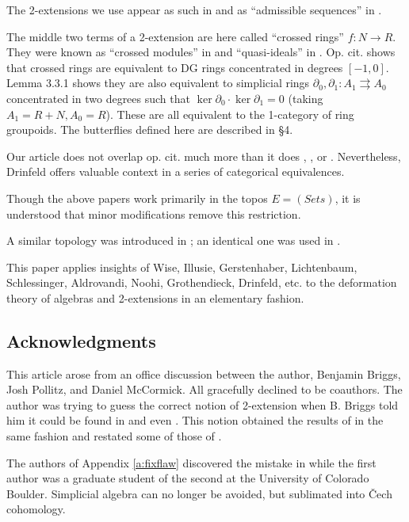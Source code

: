 \documentclass[11pt,reqno]{amsart}
\theoremstyle{definition}
\begin{document}
The 2-extensions we use appear as such in \cite{lichtenbaumschlessinger} and as ``admissible sequences'' in \cite{gerstenhaber2}. 

The middle two terms of a 2-extension are here called ``crossed rings'' $f : N \to R$. They were known as ``crossed modules'' in \cite{aldrovandianncats} and ``quasi-ideals'' in \cite{ringgroupoiddrinfeld}. Op. cit. shows that crossed rings are equivalent to DG rings concentrated in degrees $[-1, 0]$. Lemma 3.3.1 shows they are also equivalent to simplicial rings $\partial_0, \partial_1 : A_1 \rightrightarrows A_0$ concentrated in two degrees such that $\ker \partial_0 \cdot \ker \partial_1 = 0$ (taking $A_1 = R + N, A_0 = R$). These are all equivalent to the 1-category of ring groupoids. The butterflies defined here are described in \S 4. 

Our article does not overlap op. cit. much more than it does \cite{aldrovandianncats}, \cite{lichtenbaumschlessinger}, or \cite{gerstenhaber2}. Nevertheless, Drinfeld offers valuable context in a series of categorical equivalences. 

Though the above papers work primarily in the topos $E = (Sets)$, it is understood that minor modifications remove this restriction. 

A similar topology was introduced in \cite{wisealgs1}; an identical one was used in \cite{mymoduledefms}. 

This paper applies insights of Wise, Illusie, Gerstenhaber, Lichtenbaum, Schlessinger, Aldrovandi, Noohi, Grothendieck, Drinfeld, etc. to the deformation theory of algebras and 2-extensions in an elementary fashion.



\subsection*{Acknowledgments}

This article arose from an office discussion between the author, Benjamin Briggs, Josh Pollitz, and Daniel McCormick. All gracefully declined to be coauthors. The author was trying to guess the correct notion of 2-extension when B. Briggs told him it could be found in \cite{lichtenbaumschlessinger} and even \cite{gerstenhaber2}. This notion obtained the results of \cite{mymoduledefms} in the same fashion and restated some of those of \cite{wisealgs2}.

The authors of Appendix \ref{a:fixflaw} discovered the mistake in \cite{wisealgs1} while the first author was a graduate student of the second at the University of Colorado Boulder. Simplicial algebra can no longer be avoided, but sublimated into \v Cech cohomology. 
\end{document}
